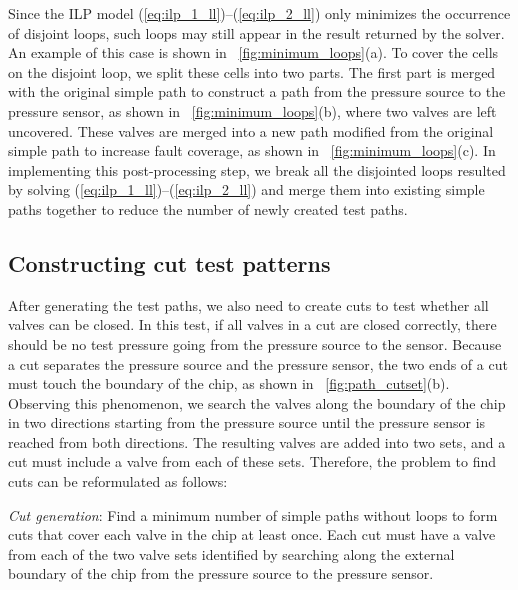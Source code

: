 Since the ILP model (\ref{eq:ilp_1_ll})--(\ref{eq:ilp_2_ll}) only minimizes
the occurrence of disjoint loops, such loops may still appear in the result returned
by the solver. An example of this case is shown in \figname~\ref{fig:minimum_loops}(a). 
To cover the cells on the disjoint loop, we split these cells into two parts.
The first part is merged with the original simple path to construct a path 
from the pressure source to the pressure sensor, as shown in  
\figname~\ref{fig:minimum_loops}(b), where two valves are left uncovered. These
valves are merged into a new path modified from the original simple path to
increase fault coverage, as shown in \figname~\ref{fig:minimum_loops}(c). In
implementing this post-processing step, we break all the disjointed loops resulted by
solving (\ref{eq:ilp_1_ll})--(\ref{eq:ilp_2_ll}) and merge them into existing
simple paths together to reduce the number of newly created test paths.

\subsection{Constructing cut test patterns}\label{sec:cut}

After generating the test paths, we also need to create cuts to test whether
all valves can be closed. In this test, if all valves in a cut are closed
correctly, there should be no test pressure going from the pressure source to
the sensor. Because a cut separates the pressure source and the pressure sensor, 
the two ends of a cut must touch the boundary of the chip, as
shown in \figname~\ref{fig:path_cutset}(b).
Observing this phenomenon, we search the valves along the
boundary of the chip in two directions starting from the pressure source 
until the pressure sensor is reached from both directions.
The resulting valves are added into two sets, and 
a cut must include a valve from each of these sets. 
Therefore, the problem to find cuts can be reformulated as follows:

\textit{Cut generation}:  Find a minimum number of simple paths without loops
to form cuts that cover each valve in the chip at least once.  Each cut must
have a valve from each of the two valve sets identified by searching along the
external boundary of the chip from the pressure source to the pressure sensor.

